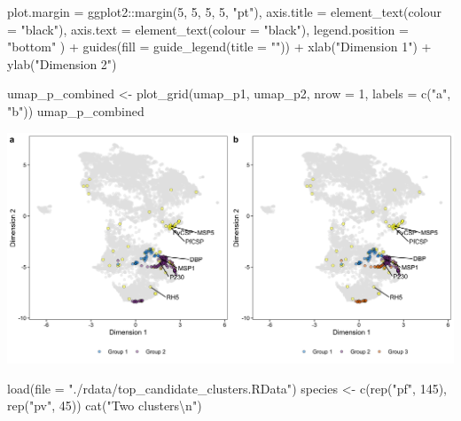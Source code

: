 \documentclass[
  11pt,
  oneside]{book}
\newenvironment{Shaded}{\begin{snugshade}}{\end{snugshade}}
\newcommand{\AttributeTok}[1]{\textcolor[rgb]{0.77,0.63,0.00}{#1}}
\newcommand{\DecValTok}[1]{\textcolor[rgb]{0.00,0.00,0.81}{#1}}
\newcommand{\FunctionTok}[1]{\textcolor[rgb]{0.00,0.00,0.00}{#1}}
\newcommand{\NormalTok}[1]{#1}
\newcommand{\OtherTok}[1]{\textcolor[rgb]{0.56,0.35,0.01}{#1}}
\newcommand{\SpecialCharTok}[1]{\textcolor[rgb]{0.00,0.00,0.00}{#1}}
\newcommand{\StringTok}[1]{\textcolor[rgb]{0.31,0.60,0.02}{#1}}
\begin{document}
\begin{Shaded}
\begin{Highlighting}[]
    \AttributeTok{plot.margin =}\NormalTok{ ggplot2}\SpecialCharTok{::}\FunctionTok{margin}\NormalTok{(}\DecValTok{5}\NormalTok{, }\DecValTok{5}\NormalTok{, }\DecValTok{5}\NormalTok{, }\DecValTok{5}\NormalTok{, }\StringTok{"pt"}\NormalTok{),}
    \AttributeTok{axis.title =} \FunctionTok{element\_text}\NormalTok{(}\AttributeTok{colour =} \StringTok{"black"}\NormalTok{),}
    \AttributeTok{axis.text =} \FunctionTok{element\_text}\NormalTok{(}\AttributeTok{colour =} \StringTok{"black"}\NormalTok{),}
    \AttributeTok{legend.position =} \StringTok{"bottom"}
\NormalTok{  ) }\SpecialCharTok{+}
  \FunctionTok{guides}\NormalTok{(}\AttributeTok{fill =} \FunctionTok{guide\_legend}\NormalTok{(}\AttributeTok{title =} \StringTok{""}\NormalTok{)) }\SpecialCharTok{+}
  \FunctionTok{xlab}\NormalTok{(}\StringTok{"Dimension 1"}\NormalTok{) }\SpecialCharTok{+}
  \FunctionTok{ylab}\NormalTok{(}\StringTok{"Dimension 2"}\NormalTok{)}
\end{Highlighting}
\end{Shaded}

\begin{Shaded}
\begin{Highlighting}[]
\NormalTok{umap\_p\_combined }\OtherTok{\textless{}{-}} \FunctionTok{plot\_grid}\NormalTok{(umap\_p1, umap\_p2, }\AttributeTok{nrow =} \DecValTok{1}\NormalTok{, }\AttributeTok{labels =} \FunctionTok{c}\NormalTok{(}\StringTok{"a"}\NormalTok{, }\StringTok{"b"}\NormalTok{))}
\NormalTok{umap\_p\_combined}
\end{Highlighting}
\end{Shaded}

\begin{center}\includegraphics[width=1\linewidth]{./figures/Supplementary Fig 12} \end{center}

\begin{Shaded}
\begin{Highlighting}[]
\FunctionTok{load}\NormalTok{(}\AttributeTok{file =} \StringTok{"./rdata/top\_candidate\_clusters.RData"}\NormalTok{)}
\NormalTok{species }\OtherTok{\textless{}{-}} \FunctionTok{c}\NormalTok{(}\FunctionTok{rep}\NormalTok{(}\StringTok{"pf"}\NormalTok{, }\DecValTok{145}\NormalTok{), }\FunctionTok{rep}\NormalTok{(}\StringTok{"pv"}\NormalTok{, }\DecValTok{45}\NormalTok{))}
\FunctionTok{cat}\NormalTok{(}\StringTok{"Two clusters}\SpecialCharTok{\textbackslash{}n}\StringTok{"}\NormalTok{)}
\end{Highlighting}
\end{Shaded}
\end{document}
